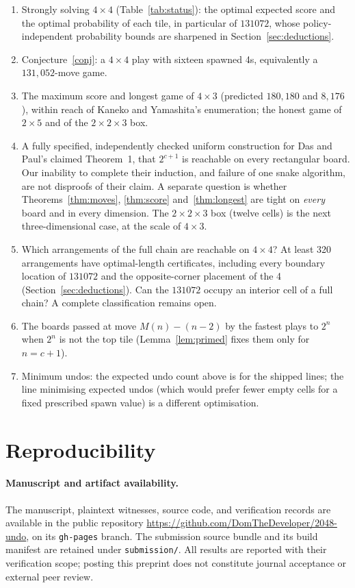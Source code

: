 \documentclass[11pt]{article}
\theoremstyle{definition}
\theoremstyle{remark}
\begin{document}
\begin{enumerate}[nosep]
\item Strongly solving $4\times4$ (Table~\ref{tab:status}): the optimal
expected score and the optimal probability of each tile, in particular of
$131072$, whose policy-independent probability bounds are sharpened in
Section~\ref{sec:deductions}.
\item Conjecture~\ref{conj}: a $4\times4$ play with sixteen spawned 4s,
equivalently a $131{,}052$-move game.
\item The maximum score and longest game of $4\times3$ (predicted
$180{,}180$ and $8{,}176$), within reach of Kaneko and Yamashita's
enumeration; the honest game of $2\times5$ and of the
$2\times2\times3$ box.
\item A fully specified, independently checked uniform construction for
Das and Paul's claimed Theorem~1, that $2^{c+1}$ is reachable on every
rectangular board. Our inability to complete their induction, and failure
of one snake algorithm, are not disproofs of their claim. A separate question
is whether Theorems~\ref{thm:moves}, \ref{thm:score}
and~\ref{thm:longest} are tight on \emph{every} board and in every
dimension. The $2\times2\times3$ box (twelve cells) is the next
three-dimensional case, at the scale of $4\times3$.
\item Which arrangements of the full chain are reachable on $4\times4$?
At least 320 arrangements have optimal-length certificates, including
every boundary location of $131072$ and the opposite-corner placement of
the 4 (Section~\ref{sec:deductions}). Can the $131072$ occupy an
interior cell of a full chain? A complete classification remains open.
\item The boards passed at move $M(n)-(n-2)$ by the fastest plays to
$2^n$ when $2^n$ is not the top tile (Lemma~\ref{lem:primed} fixes them
only for $n=c+1$).
\item Minimum undos: the expected undo count above is for the shipped
lines; the line minimising expected undos (which would prefer fewer empty cells
for a fixed prescribed spawn value) is a different optimisation.
\end{enumerate}

\section*{Reproducibility}

\paragraph{Manuscript and artifact availability.}
The manuscript, plaintext witnesses, source code, and verification records
are available in the public repository
\url{https://github.com/DomTheDeveloper/2048-undo}, on its
\texttt{gh-pages} branch. The submission source bundle and its build
manifest are retained under \texttt{submission/}. All results are
reported with their verification scope; posting this preprint does not
constitute journal acceptance or external peer review.
\end{document}
